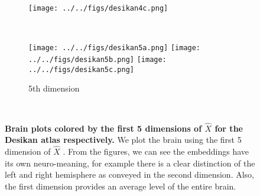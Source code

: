 \documentclass[simplex.tex]{subfiles}
\begin{document}
\begin{figure}
\begin{subfigure}[t]{0.6\textwidth}
\begin{center}
  \texttt{[image: ../../figs/desikan4c.png]}
\end{center}
\end{subfigure}\\
\vspace*{5pt}
\begin{subfigure}[t]{0.6\textwidth}
\caption{5th dimension}
\vspace*{-15pt}
\begin{center}
  \texttt{[image: ../../figs/desikan5a.png]}\hspace{-20pt}
  \texttt{[image: ../../figs/desikan5b.png]}\hspace{-20pt}
  \texttt{[image: ../../figs/desikan5c.png]}
\end{center}
\end{subfigure}\\
\caption{\textbf{Brain plots colored by the first 5 dimensions of $\hat{X}$ for the Desikan atlas respectively.} We plot the brain using the first 5 dimension of $\hat{X}$ . From the figures, we can see the embeddings have its own neuro-meaning, for example there is a clear distinction of the left and right hemisphere as conveyed in the second dimension. Also, the first dimension provides an average level of the entire brain.}
\label{fig:eigenvector_brain}
\end{figure}

%
\end{document}
